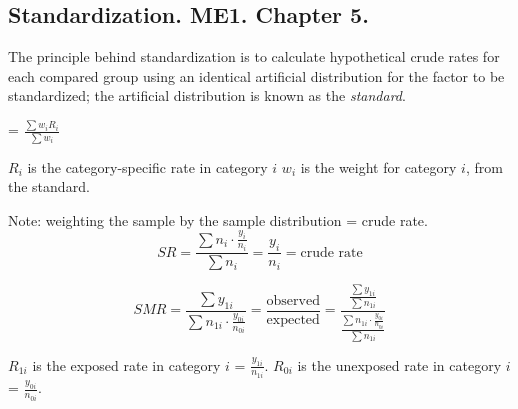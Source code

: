 \documentclass[landscape]{article}
\newcommand{\squeezeup}{\vspace{-5mm}}
\newcommand{\squeezeupp}{\vspace{-2mm}}
\begin{document}


\footnotesize{} %
\begin{multicols}{3} %

\section{Standardization. ME1. Chapter 5.}
\squeezeupp{}
\begin{tiny} The principle behind standardization is to calculate hypothetical crude rates for each compared group using an identical artificial distribution for the factor to be standardized; the artificial distribution is known as the \textit{standard}.
\end{tiny}

	\begin{description}

			\item[Standardized rate (SR)]
			= $\frac{\displaystyle \sum{w_{i}R_{i}}}{\displaystyle \sum{w_{i}}}$

			$R_{i}$ is the category-specific rate in category $i$
			$w_{i}$ is the weight for category $i$, from the standard.

			Note: weighting the sample by the sample distribution = crude rate.
			\squeezeupp{}
			\[ 
				SR = \frac{\displaystyle \sum{n_{i}\cdotp\frac{\displaystyle y_{i}}{\displaystyle n_{i}}}}{\displaystyle \sum{n_{i}}} = \frac{y_{i}}{n_{i}} = \textrm{crude rate}
			\]

			\item[Indirect]
			\squeezeup{}
			\squeezeup{}
				\[
				SMR = \frac{\sum{y_{1i}}}{\displaystyle \sum{n_{1i}\cdotp \frac{y_{0i}}{n_{0i}}}} = 
							\frac{\textrm{observed}}{\textrm{expected}} = 
							\frac	{
										\frac{\displaystyle \sum{y_{1i}}}
													{\sum{n_{1i}}} }
										 {
										\frac{{\displaystyle \sum{n_{1i}\cdotp \frac{y_{0i}}{n_{0i}}}}}
													{\displaystyle \sum{n_{1i}}}
										}
				\]

			$R_{1i}$ is the exposed rate in category $i$ = $\frac{y_{1i}}{n_{1i}}$.
			$R_{0i}$ is the unexposed rate in category $i$ = $\frac{y_{0i}}{n_{0i}}$.



\end{description}
\end{multicols}
\end{document}
